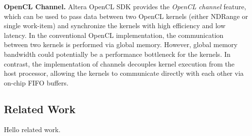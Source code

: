 {\bf OpenCL Channel. }
Altera OpenCL SDK provides the \emph{OpenCL channel} feature, which can be used to pass data between two OpenCL kernels (either NDRange or single work-item) and synchronize the kernels with high efficiency and low latency. In the conventional OpenCL implementation, the communication between two kernels is performed via global memory. However, global memory bandwidth could potentially be a performance bottleneck for the kernels. In contrast, the implementation of channels decouples kernel execution from the host processor, allowing the kernels to communicate directly with each other via on-chip FIFO buffers.

\vspace{-1ex}
\subsection{Related Work}
Hello related work. 






